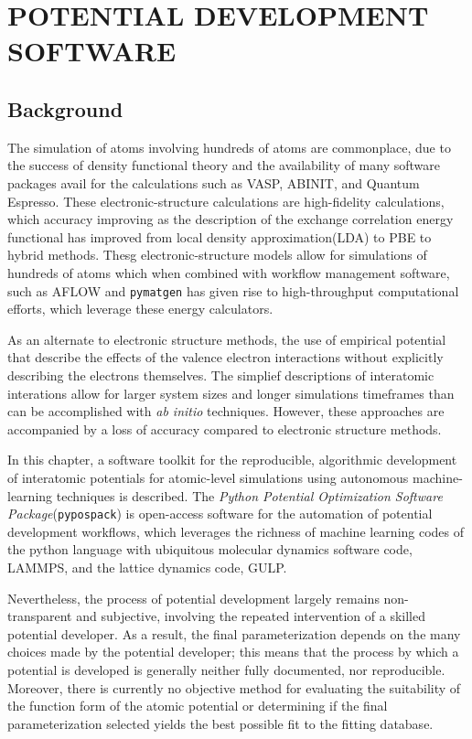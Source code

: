 \chapter{POTENTIAL DEVELOPMENT SOFTWARE}

\section{Background}
The simulation of atoms involving hundreds of atoms are commonplace, due to the success of density functional theory\cite{hohenberg1964_dft,kohn1965_dft} and the availability of many software packages avail for the calculations such as VASP\cite{kresse1993_vasp,kresse1996_vasp1,kresse1996_vasp2}, ABINIT\cite{gonze2002_abinit,gonze2005_abinit,gonze2009_abinit,gonze2016_abinit}, and Quantum Espresso\cite{giannozzi2009_quantumespresso}.  These electronic-structure calculations are high-fidelity calculations, which accuracy improving as the description of the exchange correlation energy functional has improved from local density approximation(LDA) to PBE to hybrid methods.
Thesg electronic-structure models allow for simulations of hundreds of atoms which when combined with workflow management software, such as AFLOW\cite{curtarolo2012_aflow} and \verb|pymatgen|\cite{ong2013_pymatgen} has given rise to high-throughput computational efforts, which leverage these energy calculators.

As an alternate to electronic structure methods, the use of empirical potential that describe the effects of the valence electron interactions without explicitly describing the electrons themselves.  The simplief descriptions of interatomic interations allow for larger system sizes and longer simulations timeframes than can be accomplished with \emph{ab initio} techniques.  However, these approaches are accompanied by a loss of accuracy compared to electronic structure methods.

In this chapter, a software toolkit for the reproducible, algorithmic development of interatomic potentials for atomic-level simulations using autonomous machine-learning techniques is described.
The \emph{Python Potential Optimization Software Package}(\verb|pypospack|) is open-access software for the automation of potential development workflows, which leverages the richness of machine learning codes of the python language with ubiquitous molecular dynamics software code, LAMMPS\cite{plimpton1995_lammps}, and the lattice dynamics code, GULP\cite{gale2003_gulp}.

Nevertheless, the process of potential development largely remains non-transparent and subjective, involving the repeated intervention of a skilled potential developer.\cite{martinez2013_fitting,martinez2016_posmat}
As a result, the final parameterization depends on the many choices made by the potential developer; this means that the process by which a potential is developed is generally neither fully documented, nor reproducible. Moreover, there is currently no objective method for evaluating the suitability of the function form of the atomic potential or determining if the final parameterization selected yields the best possible fit to the fitting database.

